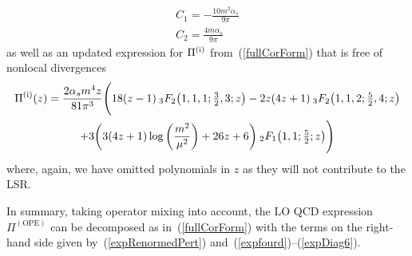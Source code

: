 \documentclass[11pt, letterpaper]{article}
\newcommand{\hypgeom}[2]{{}_{#1}F_{#2}}
\newcommand{\rom}[1]{\uppercase\expandafter{\romannumeral #1\relax}}
\begin{document}
%
\begin{gather}
C_{1} = -\frac{10 m^2 \alpha_s}{9 \pi}\\ 
C_{2} = \frac{4 m \alpha_s}{9 \pi}
\end{gather}
%
as well as an updated expression for $\Pi^{(\text{\rom{1}})}$ from~(\ref{fullCorForm}) that is free of nonlocal divergences
%
\begin{multline} \label{expRenormedPert}
  \Pi^{(\text{\rom{1}})}(z) = \frac{2 \alpha_s m^4 z}{81 \pi^3} 
  \Bigg(18(z-1)\:\hypgeom{3}{2}\big(1,1,1;\tfrac{3}{2},3;z\big) -2z (4 z + 1)\:
  \hypgeom{3}{2}\big(1,1,2;\tfrac{5}{2},4;z\big)\\
  +3 \bigg(3 (4 z+1) \log \left(\frac{m^2}{\mu ^2}\right)+26 z+6 \bigg)\:
  \hypgeom{2}{1}\big(1,1;\tfrac{5}{2};z\big) \Bigg)
\end{multline}
%
where, again, we have omitted polynomials in $z$ as they will not contribute to the LSR.

In summary, taking operator mixing into account, the LO QCD expression 
$\Pi^{(\text{OPE})}$ can be decomposed as in~(\ref{fullCorForm}) with
the terms on the right-hand side given by~(\ref{expRenormedPert}) 
and~(\ref{expfourd})--(\ref{expDiag6}).


\end{document}
